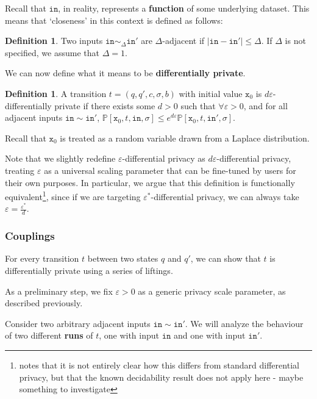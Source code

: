 \documentclass[12pt]{article}
\newcommand{\PP}{\mathbb{P}}
\theoremstyle{definition}
\newtheorem{defn}[thm]{Definition}
\begin{document}
Recall that $\texttt{in}$, in reality, represents a \textbf{function} of some underlying dataset. This means that `closeness' in this context is defined as follows:

\begin{defn}
    Two inputs $\texttt{in}\sim_{\Delta} \texttt{in}'$ are $\Delta$-adjacent if $|\texttt{in}-\texttt{in}'|\leq \Delta$. If $\Delta$ is not specified, we assume that $\Delta = 1$. 
\end{defn}

We can now define what it means  to be \textbf{differentially private}.

\begin{defn}
    A transition $t=(q, q', c, \sigma, b)$ with initial value $\texttt{x}_0$ is $d\varepsilon$-differentially private if there exists some $d>0$ such that $\forall \varepsilon> 0$, and for all adjacent inputs $\texttt{in}\sim \texttt{in}'$, $\PP[\texttt{x}_0, t, \texttt{in}, \sigma]\leq e^{d\varepsilon}\PP[\texttt{x}_0, t, \texttt{in}', \sigma]$. 

    Recall that $\texttt{x}_0$ is treated as a random variable drawn from a Laplace distribution. 
\end{defn}

Note that we slightly redefine $\varepsilon$-differential privacy as $d\varepsilon$-differential privacy, treating $\varepsilon$ as a universal scaling parameter that can be fine-tuned by users for their own purposes. 
In particular, we argue that this definition is functionally equivalent\footnote{\cite{chadhaLinearTimeDecidability2021} notes that it is not entirely clear how this differs from standard differential privacy, but that the known decidability result does not apply here - {\color{red} maybe something to investigate}}, since if we are targeting $\varepsilon^*$-differential privacy, we can always take $\varepsilon = \frac{\varepsilon^*}{d}$.

\subsubsection{Couplings}

For every transition $t$ between two states $q$ and $q'$, we can show that $t$ is differentially private using a series of liftings. 

As a preliminary step, we fix $\varepsilon>0$ as a generic privacy scale parameter, as described previously.

Consider two arbitrary adjacent inputs $\texttt{in}\sim \texttt{in}'$. We will analyze the behaviour of two different \textbf{runs} of $t$, one with input $\texttt{in}$ and one with input $\texttt{in}'$. 
\end{document}
